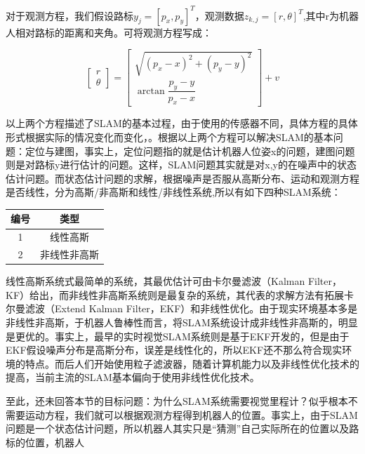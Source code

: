 \documentclass[10.5pt,twocolumn]{jbuaa}
\begin{document}
对于观测方程，我们假设路标$ y_{j} = [p_{x},p_{y}]^{T} $，观测数据$ z_{k,j} = [r,\theta]^{T} $,其中r为机器人相对路标的距离和夹角。可将观测方程写成：

\begin{equation}
\left[ \begin{array}{ccc}
r\\
\theta
\end{array} 
\right ] = \left[ \begin{array}{ccc}
\sqrt{(p_{x}-x)^2 + (p_{y}-y)^2}\\
\arctan \dfrac{p_{y}-y}{p_{x}-x}
\end{array} 
\right ] + v
\end{equation}

以上两个方程描述了SLAM的基本过程，由于使用的传感器不同，具体方程的具体形式根据实际的情况变化而变化，。根据以上两个方程可以解决SLAM的基本问题：定位与建图，事实上，定位问题指的就是估计机器人位姿x的问题，建图问题则是对路标y进行估计的问题。这样，SLAM问题其实就是对x,y的在噪声中的状态估计问题。而状态估计问题的求解，根据噪声是否服从高斯分布、运动和观测方程是否线性，分为高斯/非高斯和线性/非线性系统\cite{robust},所以有如下四种SLAM系统：

\begin{table}[h]
	\centering
	\captionnamefont{\xiaowuhao\bf }
	\captiontitlefont{\xiaowuhao\bf }
	\renewcommand\tabcolsep{1em}
	\begin{tabular}{cc}
		\toprule
		{编号} &  {类型}\\
		\midrule 
		1 & 线性高斯 \\
		2 & 非线性非高斯\\
		\bottomrule
	\end{tabular}
\end{table}

线性高斯系统式最简单的系统，其最优估计可由卡尔曼滤波（Kalman Filter，KF）给出，而非线性非高斯系统则是最复杂的系统，其代表的求解方法有拓展卡尔曼滤波（Extend Kalman Filter，EKF）和非线性优化\cite{gaoxiang14slam}。由于现实环境基本多是非线性非高斯，于机器人鲁棒性而言，将SLAM系统设计成非线性非高斯的，明显是更优的。事实上，最早的实时视觉SLAM系统则是基于EKF开发的，但是由于EKF假设噪声分布是高斯分布，误差是线性化的，所以EKF还不那么符合现实环境的特点。而后人们开始使用粒子滤波器，随着计算机能力以及非线性优化技术的提高，当前主流的SLAM基本偏向于使用非线性优化技术。

至此，还未回答本节的目标问题：为什么SLAM系统需要视觉里程计？似乎根本不需要运动方程，我们就可以根据观测方程得到机器人的位置。事实上，由于SLAM问题是一个状态估计问题，所以机器人其实只是“猜测”自己实际所在的位置以及路标的位置，机器人
 
\end{document}
